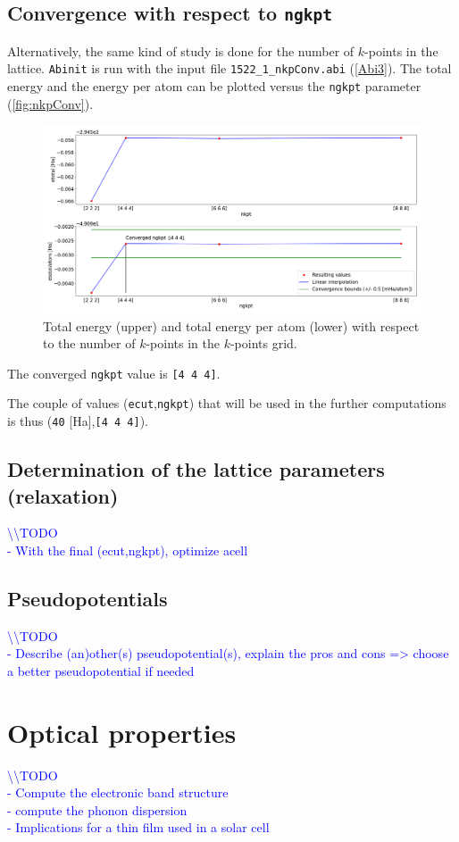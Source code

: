 \documentclass[11pt,a4paper]{article}
\begin{document}
\subsection{Convergence with respect to \texttt{ngkpt}}
Alternatively, the same kind of study is done for the number of $k$-points in the lattice. \texttt{Abinit} is run with the input file \texttt{1522\_1\_nkpConv.abi} (\autoref{Abi3}). The total energy and the energy per atom can be plotted versus the \texttt{ngkpt} parameter (\autoref{fig:nkpConv}).
\begin{figure}[H]
\includegraphics[width=\textwidth]{images/nkpConv}
\caption{Total energy (upper) and total energy per atom (lower) with respect to the number of $k$-points in the $k$-points grid.}
\label{fig:nkpConv}
\end{figure}
The converged \texttt{ngkpt} value is \texttt{[4 4 4]}.

The couple of values (\texttt{ecut},\texttt{ngkpt}) that will be used in the further computations is thus (\texttt{40} [Ha],\texttt{[4 4 4]}).
\subsection{Determination of the lattice parameters (relaxation)}
\textcolor{blue}{
\textbackslash\textbackslash TODO\\
- With the final (ecut,ngkpt), optimize acell}
\subsection{Pseudopotentials}
\textcolor{blue}{
\textbackslash\textbackslash TODO\\
- Describe (an)other(s) pseudopotential(s), explain the pros and cons => choose a better pseudopotential if needed}
\newpage
\section{Optical properties}
\textcolor{blue}{
\textbackslash\textbackslash TODO\\
- Compute the electronic band structure\\
- compute the phonon dispersion\\
- Implications for a thin film used in a solar cell}
\newpage
\end{document}

